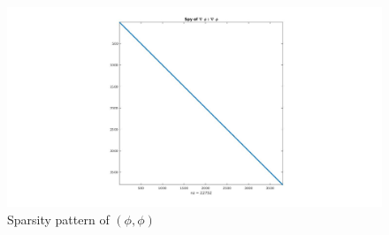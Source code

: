 \documentclass[a4paper,12pt]{book}
\begin{document}
\begin{figure}[H]
\centering
  \includegraphics[width=\linewidth]{figure1.jpg}
  \caption{Sparsity pattern of $(\phi,\phi)$}
  \label{fig:sparsity_del_phi_del_phi}
\end{figure}
\end{document}

